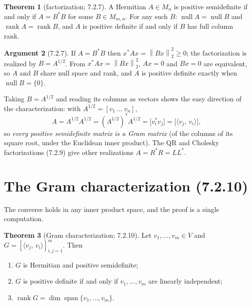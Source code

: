 \documentclass[11pt]{article}
\newcommand{\M}{M}
\newcommand{\norm}[1]{\left\lVert #1\right\rVert}
\newcommand{\inner}[2]{\langle #1,\,#2\rangle}
\newcommand{\adj}{^{*}}
\DeclareMathOperator{\rank}{rank}
\DeclareMathOperator{\spann}{span}
\DeclareMathOperator{\nullsp}{null}
\theoremstyle{definition}
\newtheorem{theorem}{Theorem}[section]
\newtheorem{argument}[theorem]{Argument}
\begin{document}
\begin{theorem}[factorization; 7.2.7]
A Hermitian $A\in\M_n$ is positive semidefinite if and only if $A=B\adj B$ for
some $B\in\M_{m,n}$.  For any such $B$: $\nullsp A=\nullsp B$ and
$\rank A=\rank B$, and $A$ is positive definite if and only if $B$ has full column
rank.
\end{theorem}

\begin{argument}[7.2.7]
If $A=B\adj B$ then $x\adj Ax=\norm{Bx}_2^2\ge 0$; the factorization is realized by
$B=A^{1/2}$.  From $x\adj Ax=\norm{Bx}_2^2$, $Ax=0$ and $Bx=0$ are equivalent, so
$A$ and $B$ share null space and rank, and $A$ is positive definite exactly when
$\nullsp B=\{0\}$.
\end{argument}

Taking $B=A^{1/2}$ and reading its columns as vectors shows the easy direction of
the characterization: with $A^{1/2}=[v_1\ \dots\ v_n]$,
\[
  A=A^{1/2}A^{1/2}=(A^{1/2})\adj A^{1/2}=\bigl[v_i\adj v_j\bigr]
   =\bigl[\inner{v_j}{v_i}\bigr],
\]
so \emph{every positive semidefinite matrix is a Gram matrix} (of the columns of
its square root, under the Euclidean inner product).  The QR and Cholesky
factorizations (7.2.9) give other realizations $A=R\adj R=LL\adj$.

\section{The Gram characterization (7.2.10)}

The converse holds in any inner product space, and the proof is a single
computation.

\begin{theorem}[Gram characterization; 7.2.10]
Let $v_1,\dots,v_m\in V$ and $G=[\inner{v_j}{v_i}]_{i,j=1}^m$.  Then
\begin{enumerate}
\item[(a)] $G$ is Hermitian and positive semidefinite;
\item[(b)] $G$ is positive definite if and only if $v_1,\dots,v_m$ are linearly
  independent;
\item[(c)] $\rank G=\dim\spann\{v_1,\dots,v_m\}$.
\end{enumerate}
\end{theorem}
\end{document}
